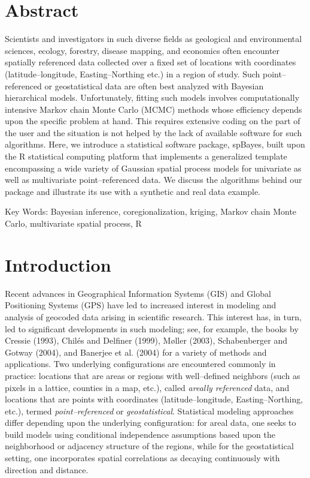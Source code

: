 \documentclass[a4paper]{article}
\let\proglang=\textsf
\newcommand{\pkg}[1]{{\normalfont\fontseries{b}\selectfont #1}}
\begin{document}
\section*{Abstract}
  Scientists and investigators in such diverse fields as
  geological and environmental sciences, ecology, forestry, disease mapping, and economics often encounter spatially referenced data
  collected over a fixed set of locations with coordinates (latitude--longitude, Easting--Northing etc.)
  in a region of study. Such point--referenced or geostatistical data are often best analyzed with Bayesian hierarchical models.
  Unfortunately, fitting such models involves computationally
  intensive Markov chain Monte Carlo (MCMC) methods whose
  efficiency depends upon the specific problem at hand. This requires extensive coding on the part of the
  user and the situation is not helped by the lack of available software
  for such algorithms. Here, we introduce a statistical software package, \pkg{spBayes},
  built upon the \proglang{R} statistical computing platform that
  implements a generalized template encompassing a wide variety of Gaussian spatial process models for univariate as
  well as multivariate point--referenced data. We discuss the algorithms behind our
  package and illustrate its use with a synthetic and real data example.


\bigskip
\noindent
{\sc Key Words:}  Bayesian inference, coregionalization, kriging, Markov chain Monte Carlo, multivariate spatial process, \proglang{R}


\section{Introduction} \label{Intro}

Recent advances in Geographical Information Systems (GIS) and Global
Positioning Systems (GPS) have led to increased interest in modeling
and analysis of geocoded data arising in scientific research. This
interest has, in turn, led to significant developments in such
modeling; see, for example, the books by Cressie (1993), Chil\'es and Delfiner (1999), M{\o}ller (2003), Schabenberger and Gotway (2004), and Banerjee et al. (2004) for a
variety of methods and applications. Two underlying configurations
are encountered commonly in practice: locations that are areas or
regions with well--defined neighbors (such as pixels in a lattice,
counties in a map, etc.), called \emph{areally
referenced} data, and locations that are points with coordinates
(latitude--longitude, Easting--Northing, etc.), termed \emph{point--referenced} or \emph{geostatistical}.
Statistical modeling approaches differ depending upon the underlying
configuration: for areal data, one seeks to build models using
conditional independence assumptions based upon the neighborhood or
adjacency structure of the regions, while for the geostatistical
setting, one incorporates spatial correlations as decaying
continuously with direction and distance.
\end{document}
